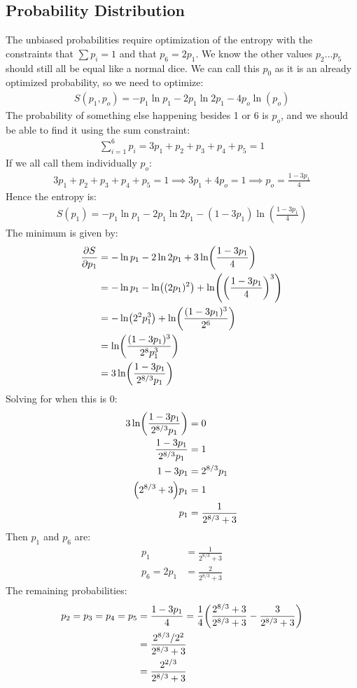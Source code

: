 \documentclass[12pt]{article}
\begin{document}
\subsection{Probability Distribution}
The unbiased probabilities require optimization of the entropy with the constraints that $\sum p_i=1$ and that $p_6=2p_1$. We know the other values $p_2...p_5$ should still all be equal like a normal dice. We can call this $p_0$ as it is an already optimized probability, so we need to optimize:
\begin{align*}
  S(p_1,p_o)=-p_1\ln p_1-2p_1\ln 2p_1-4p_o\ln(p_o)
\end{align*}
The probability of something else happening besides 1 or 6 is $p_o$, and we should be able to find it using the sum constraint:
\begin{align*}
  \sum_{i=1}^6p_i=3p_1+p_2+p_3+p_4+p_5=1
\end{align*}
If we all call them individually $p_o$:
\begin{align*}
  3p_1+p_2+p_3+p_4+p_5=1\implies3p_1+4p_o=1\implies p_o=\frac{1-3p_1}{4}
\end{align*}
Hence the entropy is:
\begin{align*}
  S(p_1)=-p_1\ln p_1-2p_1\ln 2p_1-(1-3p_1)\ln(\frac{1-3p_1}{4})
\end{align*}
The minimum is given by:
\begin{align*}
  \pdv{S}{p_1}&=-\ln p_1-2\ln 2p_1+3\ln(\frac{1-3p_1}{4})\\
  &=-\ln p_1-\ln((2p_1)^2)+\ln(\qty(\frac{1-3p_1}{4})^3)\\
  &=-\ln(2^2p_1^3)+\ln(\frac{(1-3p_1)^3}{2^6})\\
  &=\ln(\frac{(1-3p_1)^3}{2^8p_1^3})\\
  &=3\ln(\frac{1-3p_1}{2^{8/3}p_1})
\end{align*}
Solving for when this is $0$:
\begin{align*}
  3\ln(\frac{1-3p_1}{2^{8/3}p_1})&=0\\
  \frac{1-3p_1}{2^{8/3}p_1}&=1\\
  1-3p_1&=2^{8/3}p_1\\
  \qty(2^{8/3}+3)p_1&=1\\
  p_1&=\frac1{2^{8/3}+3}
\end{align*}
Then $p_1$ and $p_6$ are:
\begin{align*}
  p_1&=\frac1{2^{8/3}+3}\\
  p_6=2p_1&=\frac2{2^{8/3}+3}
\end{align*}
The remaining probabilities:
\begin{align*}
  p_2=p_3=p_4=p_5&=\frac{1-3p_1}4=
  \frac14\qty(\frac{2^{8/3}+3}{2^{8/3}+3}-\frac3{2^{8/3}+3})\\
  &=\frac{2^{8/3}/2^2}{2^{8/3}+3}\\
  &=\frac{2^{2/3}}{2^{8/3}+3}
\end{align*}
\end{document}
